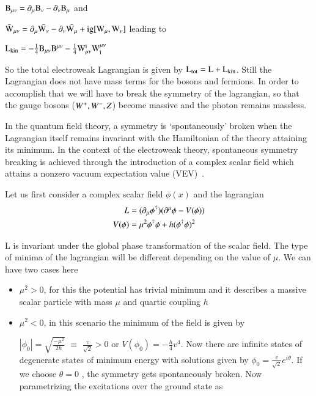 $\rm B_{\mu\nu} = \partial_{\mu}B_{\nu} - \partial_{\nu}B_{\mu}$  and

$\rm \bar{W}_{\mu\nu} = \partial_{\mu}\bar{W_{\nu}} - \partial_{\nu}\bar{W_{\mu}} + ig[W_{\mu},W_{\nu}]$ leading to 

$\rm L_{kin} = - \frac{1}{4}B_{\mu\nu}B^{\mu\nu} - \frac{1}{4}W_{\mu\nu}^{i}W^{\mu\nu}_{i}$

So the total electroweak Lagrangian is given by
$\rm L_{tot} = L + L_{kin}$. Still the Lagrangian does not have mass terms for the bosons and fermions. In order to accomplish that we will have to break the symmetry of the lagrangian, so that the gauge bosons ($\it W^{+}, W^{-}, Z$) become massive and the photon remains massless.    

In the quantum field theory, a symmetry is `spontaneously' broken when the Lagrangian itself remains invariant with the Hamiltonian of the theory attaining its minimum. In the context of the electroweak theory, spontaneous symmetry breaking is achieved through the introduction of a complex scalar field which attains a nonzero vacuum expectation value (VEV)~\cite{higgs}.

Let us first consider a complex scalar field $\phi(x)$ and the  lagrangian  
\begin{align}\label{Lagra}
\it L & = (\partial_{\mu}\phi^{\dagger})(\partial^{\mu}\phi - V(\phi))  \\
V(\phi) & = \mu^{2}\phi^{\dagger}\phi + h(\phi^{\dagger}\phi)^{2}
\end{align}

L is invariant under the global phase transformation of the scalar field. The type of minima of the lagrangian will be different depending on the value of $\mu$. We can have two cases here 
\begin{itemize}
\item $\mu^{2} > 0$, for this the potential has trivial minimum and it describes a massive scalar particle with mass $\mu$ and quartic coupling $h$

\item $\mu^{2} < 0$, in this scenario the minimum of the field is given by  

$|\phi_{0}| = \sqrt{\frac{-\mu^{2}}{2h}}$ $\equiv$ $\frac{v}{\sqrt{2}} > 0$  or $V(\phi_{0}) = -\frac{h}{4}v^{4}$.  Now there are infinite states of degenerate states of minimum energy with solutions given by $\phi_{0} = \frac{v}{\sqrt{2}} e^{i\theta}$. If we choose $\theta =0$ , the symmetry gets spontaneously broken. Now parametrizing the excitations over the ground state as

\end{itemize}

